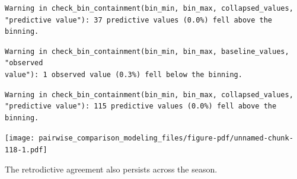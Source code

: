 \documentclass[
  letterpaper,
  DIV=11,
  numbers=noendperiod]{scrartcl}
\newenvironment{Shaded}{\begin{snugshade}}{\end{snugshade}}
\newcommand{\AttributeTok}[1]{\textcolor[rgb]{0.40,0.45,0.13}{#1}}
\newcommand{\DecValTok}[1]{\textcolor[rgb]{0.68,0.00,0.00}{#1}}
\newcommand{\FunctionTok}[1]{\textcolor[rgb]{0.28,0.35,0.67}{#1}}
\newcommand{\NormalTok}[1]{\textcolor[rgb]{0.00,0.23,0.31}{#1}}
\newcommand{\SpecialCharTok}[1]{\textcolor[rgb]{0.37,0.37,0.37}{#1}}
\newcommand{\StringTok}[1]{\textcolor[rgb]{0.13,0.47,0.30}{#1}}
\begin{document}
\begin{verbatim}
Warning in check_bin_containment(bin_min, bin_max, collapsed_values,
"predictive value"): 37 predictive values (0.0%) fell above the binning.
\end{verbatim}

\begin{verbatim}
Warning in check_bin_containment(bin_min, bin_max, baseline_values, "observed
value"): 1 observed value (0.3%) fell below the binning.
\end{verbatim}

\begin{Shaded}
\end{Shaded}

\begin{verbatim}
Warning in check_bin_containment(bin_min, bin_max, collapsed_values,
"predictive value"): 115 predictive values (0.0%) fell above the binning.
\end{verbatim}

\texttt{[image: pairwise\_comparison\_modeling\_files/figure-pdf/unnamed-chunk-118-1.pdf]}

The retrodictive agreement also persists across the season.
\end{document}
